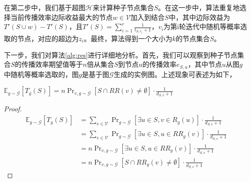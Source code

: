 在第二步中，我们基于超图$\mathcal{H}$来计算种子节点集合$S$。在这一步中，算法重复地选择当前传播效率边际收益最大的节点$w \in \mathcal{V}$加入到结合$S$中，其中边际效益为$T'\left(S \cup w\right) - T'\left(S\right)$，且$T'\left(S\right) = \sum_{i=1}^r{\frac{1}{t_{S,v_i}+1}}$，$v_i$为第i轮迭代中随机等概率选取的节点，对应的超边为$z_i$。最终，算法得到一个大小为$k$的节点集合$S$。

下一步，我们对算法\ref{alg:res}进行详细地分析。首先，我们可以观察到种子节点集合$S$的传播效率期望值等于$n$倍从集合$S$到节点$u$的传播效率$e_{S,u}$，其中节点$u$从图$g$中随机等概率选取的，图$g$是基于图$\mathcal{G}$生成的实例图。上述现象可表述为如下，
\begin{mytheo}\label{theo:observe}
$\mathbb{E}_{g\sim\mathcal{G}}\left[T_g\left(S\right)\right]=n\Pr\nolimits_{v,g\sim\mathcal{G}}\left[S\cap RR\left(v\right)\neq\emptyset\right]\cdot\frac{1}{d_{S,v}+1}$
\end{mytheo}
\begin{proof}
    \begin{equation*}
        \begin{split}
            \mathbb{E}_{g\sim\mathcal{G}}\left[T_g\left(S\right)\right] & = \sum\limits_{v \in \mathcal{V}}{\Pr\nolimits_{g \sim \mathcal{G}}{\left[ \exists u \in S, v \in R_g \left(u\right) \right] \cdot \frac{1}{d_{S,v}+1}}}\\
            & = \sum\limits_{v \in \mathcal{V}}{\Pr\nolimits_{g \sim \mathcal{G}}{\left[ \exists u \in S, u \in {RR}_g \left(v\right) \right] \cdot \frac{1}{d_{S,v}+1}}}\\
            & = n \Pr\nolimits_{v,g \sim \mathcal{G}}{\left[ \exists u \in S, u \in {RR}_g \left(v\right) \right] \cdot \frac{1}{d_{S,v}+1}}\\
            & = n \Pr\nolimits_{v,g \sim \mathcal{G}}{\left[ S \cap {RR}_g \left(v\right) \neq \emptyset \right] \cdot \frac{1}{d_{S,v}+1}}
        \end{split}
    \end{equation*}
\end{proof}

